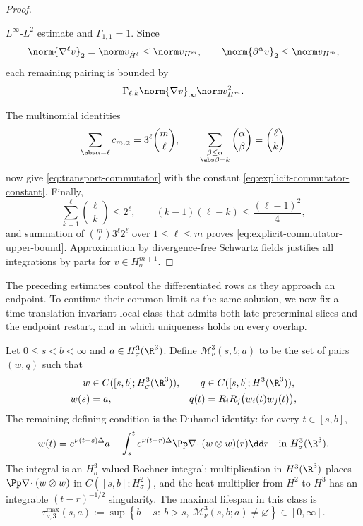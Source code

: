 \begin{proof}
\begin{samepage}
\(L^\infty\)-\(L^2\) estimate and \(\Gamma_{1,1}=1\).  Since
\[
 \norm{\nabla^\ell v}_2=\norm v_{\dot H^\ell}\le\norm v_{H^m},
 \qquad
 \norm{\partial^\alpha v}_2\le\norm v_{H^m},
\]
each remaining pairing is bounded by
\[
 \Gamma_{\ell,k}\norm{\nabla v}_\infty\norm v_{H^m}^2.
\]
\par
\end{samepage}
The multinomial identities
\[
 \sum_{\abs\alpha=\ell}c_{m,\alpha}
 =3^\ell\binom m\ell,
 \qquad
 \sum_{\substack{\beta\le\alpha\\\abs\beta=k}}
 \binom\alpha\beta=\binom\ell k
\]
now give \eqref{eq:transport-commutator} with the constant
\eqref{eq:explicit-commutator-constant}.  Finally,
\[
 \sum_{k=1}^{\ell}\binom\ell k\le2^\ell,
 \qquad
 (k-1)(\ell-k)\le\frac{(\ell-1)^2}{4},
\]
and summation of
\(
 \binom m\ell3^\ell2^\ell
\)
over \(1\le\ell\le m\) proves
\eqref{eq:explicit-commutator-upper-bound}.  Approximation by divergence-free
Schwartz fields justifies all integrations by parts for
\(v\in H^{m+1}_\sigma\).
\end{proof}

The preceding estimates control the differentiated rows as they approach an
endpoint.  To continue their common limit as the same solution, we now fix a
time-translation-invariant local class that admits both late preterminal
slices and the endpoint restart, and in which uniqueness holds on every
overlap.

\begin{definition}
\label{def:shifted-normalized-H3-mild-class}
Let \(0\le s<b<\infty\) and \(a\in H^3_\sigma(\R^3)\).  Define
\(\mathscr M_\nu^3(s,b;a)\) to be the set of pairs \((w,q)\) such that
\begin{align}
 w&\in C([s,b];H^3_\sigma(\R^3)),
 &q&\in C([s,b];H^3(\R^3)),
 \label{eq:shifted-mild-class-spaces}\\
 w(s)&=a,
 &q(t)&=R_iR_j\bigl(w_i(t)w_j(t)\bigr),
 \label{eq:shifted-mild-class-datum-pressure}
\end{align}
The remaining defining condition is the Duhamel identity: for every
\(t\in[s,b]\),
\begin{equation}
 w(t)=e^{\nu(t-s)\Delta}a
 -\int_s^t e^{\nu(t-r)\Delta}
 \Pp\nabla\!\cdot(w\otimes w)(r)\dd r
 \quad\text{in }H^3_\sigma(\R^3).
 \label{eq:shifted-mild-class-duhamel}
\end{equation}
The integral is an \(H^3_\sigma\)-valued Bochner integral: multiplication in
\(H^3(\R^3)\) places
\(\Pp\nabla\!\cdot(w\otimes w)\) in \(C([s,b];H^2_\sigma)\), and the heat
multiplier from \(H^2\) to \(H^3\) has an integrable
\((t-r)^{-1/2}\) singularity.
The maximal lifespan in this class is
\begin{equation}
 \tau_{\nu,3}^{\max}(s,a)
 :=\sup\left\{b-s:\ b>s,\
 \mathscr M_\nu^3(s,b;a)\ne\varnothing\right\}\in[0,\infty].
 \label{eq:shifted-mild-maximal-lifespan}
\end{equation}
\end{definition}

